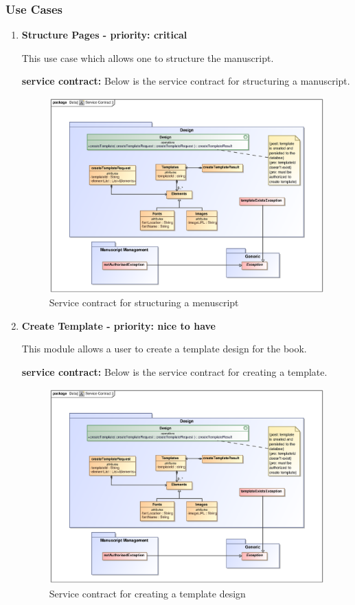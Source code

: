 \subsubsection{Use Cases}
\begin{enumerate}
\item \textbf{Structure Pages - priority: critical}
\par{This use case which allows one to structure the  manuscript.}
\par{\textbf{service contract:} Below is the service contract for structuring a manuscript.
}
\begin{figure}[h]
\includegraphics[scale=0.8,width=400px]{epsImages/Design/createTemplateServiceContract.eps}
\centering
\caption{Service contract for structuring a menuscript}
\end{figure}

\newpage
\item \textbf{Create Template - priority: nice to have}
\par{This module allows a user to create a template design for the book.}
\par{\textbf{service contract:} Below is the service contract for creating a template.
}
 \begin{figure}[h]
\includegraphics[scale=0.8,width=400px]{epsImages/Design/createTemplateServiceContract.eps}
\centering
\caption{Service contract for creating a template design}
\end{figure}


\end{enumerate}
